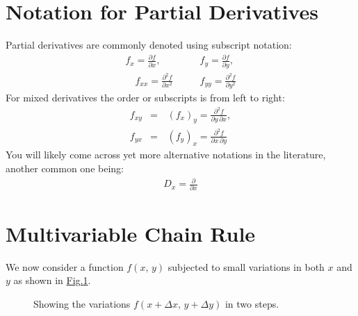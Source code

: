 \documentclass[letterpaper,10pt,english]{jupyterBook}
\begin{document}
\section{Notation for Partial Derivatives}
\label{\detokenize{VectorCalculus/partialdifferentiation:notation-for-partial-derivatives}}
\sphinxAtStartPar
Partial derivatives are commonly denoted using subscript notation:
\begin{equation*}
\begin{split}f_x=\frac{\partial f}{\partial x}, &\quad&\, f_y=\frac{\partial f}{\partial y}, \\
\quad f_{xx}=\frac{\partial^2 f}{\partial x^2} &\quad&\, f_{yy}=\frac{\partial^2 f}{\partial y^2}\end{split}
\end{equation*}
\sphinxAtStartPar
For mixed derivatives the order or subscripts is from left to right:
\begin{equation*}
\begin{split}f_{xy} &=&\, (f_x)_y = \frac{\partial^2 f}{\partial y\, \partial x}, \\
f_{yx} &=&\, (f_y)_x = \frac{\partial^2 f}{\partial x\, \partial y}\end{split}
\end{equation*}
\sphinxAtStartPar
You will likely come across yet more alternative notations in the literature, another common one being:
\begin{equation*}
\begin{split}D_x=\frac{\partial}{\partial x}\end{split}
\end{equation*}

\section{Multivariable Chain Rule}
\label{\detokenize{VectorCalculus/partialdifferentiation:multivariable-chain-rule}}
\sphinxAtStartPar
We now consider a function \(f(x,\,y)\) subjected to small variations in both \(x\) and \(y\) as shown in \hyperref[\detokenize{VectorCalculus/partialdifferentiation:two-step}]{Fig.\@ \ref{\detokenize{VectorCalculus/partialdifferentiation:two-step}}}.

\begin{figure}[htbp]
\centering
\capstart

\noindent{}
\caption{Showing the variations \(f(x+\Delta x, \,y+\Delta y)\) in two steps.}\label{\detokenize{VectorCalculus/partialdifferentiation:two-step}}\end{figure}
\end{document}
